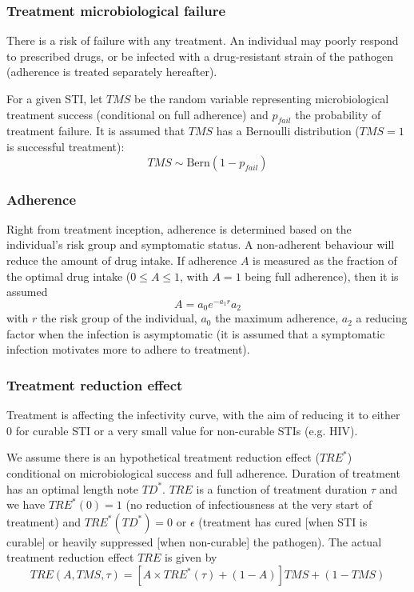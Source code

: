 \documentclass[11pt, onecolumn]{article}
\begin{document}
\subsubsection{Treatment microbiological failure}

There is a risk of failure with any treatment. An individual may poorly respond to prescribed drugs, or be infected with a drug-resistant strain of the pathogen (adherence is treated separately hereafter).

For a given STI, let $TMS$ be the random variable representing microbiological treatment success (conditional on full adherence) and $p_{fail}$ the probability of treatment failure. It is assumed that $TMS$ has a Bernoulli distribution ($TMS=1$ is successful treatment):
$$TMS \sim \mathrm{Bern}(1- p_{fail})$$


\subsubsection{Adherence}

Right from treatment inception, adherence is determined based on the individual's risk group and symptomatic status. A non-adherent behaviour will reduce the amount of drug intake. If adherence $A$ is measured as the fraction of the optimal drug intake ($0 \leq A\leq 1$, with $A=1$ being full adherence), then it is assumed
$$ A = a_0 e^{-a_1 r} a_2$$
with $r$ the risk group of the individual, $a_0$ the maximum adherence, $a_2$ a reducing factor when the infection is asymptomatic (it is assumed that a symptomatic infection motivates more to adhere to treatment).


\subsubsection{Treatment reduction effect}

Treatment is affecting the infectivity curve, with the aim of reducing it to either 0 for curable STI or a very small value for non-curable STIs (e.g. HIV). 

We assume there is an hypothetical treatment reduction effect ($TRE^*$) conditional on microbiological success and full adherence. Duration of treatment has an optimal length note $TD^*$. $TRE$ is a function of treatment duration $\tau$ and we have $TRE^*(0)=1$ (no reduction of infectiousness at the very start of treatment) and $TRE^*(TD^*)=0$ or $\epsilon$ (treatment has cured [when STI is curable] or heavily suppressed [when non-curable] the pathogen). The actual treatment reduction effect $TRE$ is given by
$$TRE(A, TMS,\tau) = \left[A\times TRE^*(\tau) + (1-A) \right] TMS + (1-TMS) $$
\end{document}
